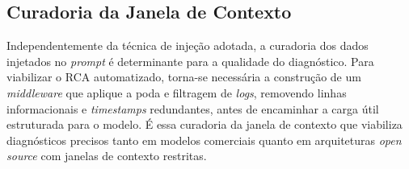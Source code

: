 \subsection{Curadoria da Janela de Contexto}
\label{subsec:curadoria_contexto}

Independentemente da técnica de injeção adotada, a curadoria dos dados injetados no \textit{prompt} é determinante para a qualidade do diagnóstico. Para viabilizar o RCA automatizado, torna-se necessária a construção de um \textit{middleware} que aplique a poda e filtragem de \textit{logs}, removendo linhas informacionais e \textit{timestamps} redundantes, antes de encaminhar a carga útil estruturada para o modelo. É essa curadoria da janela de contexto que viabiliza diagnósticos precisos tanto em modelos comerciais quanto em arquiteturas \textit{open source} com janelas de contexto restritas.

